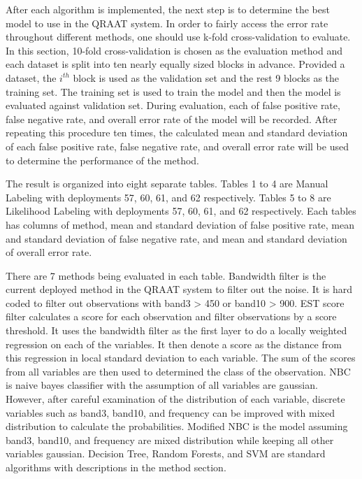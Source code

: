 \documentclass[twoside]{article}
\begin{document}
After each algorithm is implemented, the next step is to determine the best model to use in the QRAAT system. In order to fairly access the error rate throughout different methods, one should use k-fold cross-validation to evaluate. In this section, 10-fold cross-validation is chosen as the evaluation method and each dataset is split into ten nearly equally sized blocks in advance. Provided a dataset, the $i^{th}$ block is used as the validation set and the rest 9 blocks as the training set. The training set is used to train the model and then the model is evaluated against validation set. During evaluation, each of false positive rate, false negative rate, and overall error rate of the model will be recorded. After repeating this procedure ten times, the calculated mean and standard deviation of each false positive rate, false negative rate, and overall error rate will be used to determine the performance of the method. 

The result is organized into eight separate tables. Tables 1 to 4 are Manual Labeling with deployments 57, 60, 61, and 62 respectively. Tables 5 to 8 are Likelihood Labeling with deployments 57, 60, 61, and 62 respectively. Each tables has columns of method, mean and standard deviation of false positive rate, mean and standard deviation of false negative rate, and mean and standard deviation of overall error rate. 

There are 7 methods being evaluated in each table. Bandwidth filter is the current deployed method in the QRAAT system to filter out the noise. It is hard coded to filter out observations with band3 > 450 or band10 > 900. EST score filter calculates a score for each observation and filter observations by a score threshold. It uses the bandwidth filter as the first layer to do a locally weighted regression on each of the variables. It then denote a score as the distance from this regression in local standard deviation to each variable. The sum of the scores from all variables are then used to determined the class of the observation. NBC is naive bayes classifier with the assumption of all variables are gaussian. However, after careful examination of the distribution of each variable, discrete variables such as band3, band10, and frequency can be improved with mixed distribution to calculate the probabilities. Modified NBC is the model assuming band3, band10, and frequency are mixed distribution while keeping all other variables gaussian. Decision Tree, Random Forests, and SVM are standard algorithms with descriptions in the method section.
\end{document}
